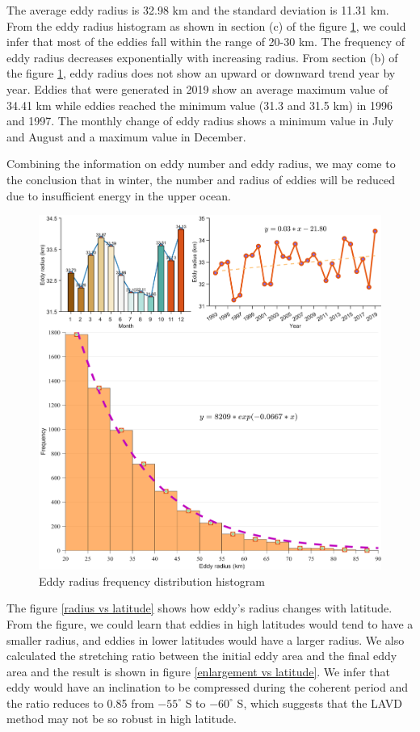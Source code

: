 The average eddy radius is 32.98 km and the standard deviation is 11.31 km. From the eddy radius histogram as shown in section (c) of the figure \ref{Eddy radius map}, we could infer that most of the eddies fall within the range of 20-30 km. The frequency of eddy radius decreases exponentially with increasing radius. From section (b) of the figure \ref{Eddy radius map}, eddy radius does not show an upward or downward trend year by year. Eddies that were generated in 2019 show an average maximum value of 34.41 km while eddies reached the minimum value (31.3 and 31.5 km) in 1996 and 1997. The monthly change of eddy radius shows a minimum value in July and August and a maximum value in December.

Combining the information on eddy number and eddy radius, we may come to the conclusion that in winter, the number and radius of eddies will be reduced due to insufficient energy in the upper ocean.

\begin{figure}
    \centering
    \includegraphics[width =15cm]{chapter/figure/eddy radius2.png}
    \caption{Eddy radius frequency distribution histogram}
    \label{Eddy radius map}
\end{figure}

The figure \ref{radius vs latitude} shows how eddy's radius changes with latitude. From the figure, we could learn that eddies in high latitudes would tend to have a smaller radius, and eddies in lower latitudes would have a larger radius. We also calculated the stretching ratio between the initial eddy area and the final eddy area and the result is shown in figure \ref{enlargement vs latitude}. We infer that eddy would have an inclination to be compressed during the coherent period and the ratio reduces to 0.85 from  $-55^\circ$ S to $-60^\circ $ S, which suggests that the LAVD method may not be so robust in high latitude.

